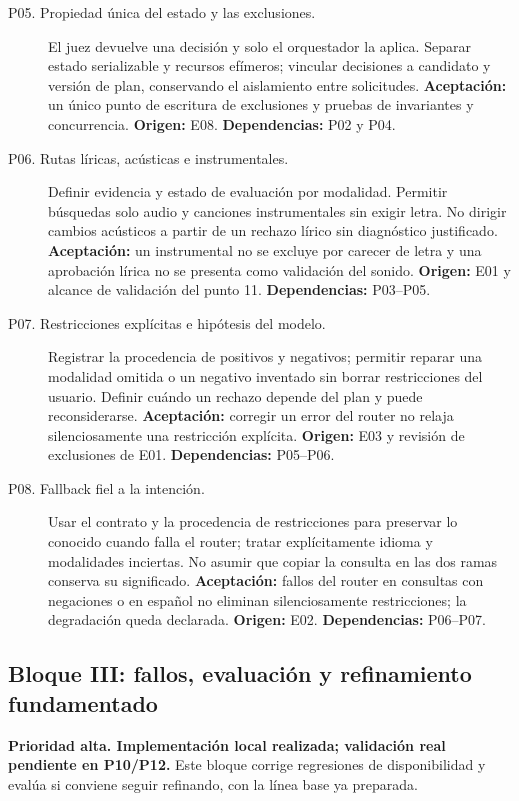 \begin{description}
\item[P05. Propiedad única del estado y las exclusiones.]
El juez devuelve una decisión y solo el orquestador la aplica. Separar estado
serializable y recursos efímeros; vincular decisiones a candidato y versión
de plan, conservando el aislamiento entre solicitudes.
\textbf{Aceptación:} un único punto de escritura de exclusiones y pruebas de
invariantes y concurrencia. \textbf{Origen:} E08.
\textbf{Dependencias:} P02 y P04.

\item[P06. Rutas líricas, acústicas e instrumentales.]
Definir evidencia y estado de evaluación por modalidad. Permitir búsquedas
solo audio y canciones instrumentales sin exigir letra. No dirigir cambios
acústicos a partir de un rechazo lírico sin diagnóstico justificado.
\textbf{Aceptación:} un instrumental no se excluye por carecer de letra y una
aprobación lírica no se presenta como validación del sonido.
\textbf{Origen:} E01 y alcance de validación del punto 11.
\textbf{Dependencias:} P03--P05.

\item[P07. Restricciones explícitas e hipótesis del modelo.]
Registrar la procedencia de positivos y negativos; permitir reparar una
modalidad omitida o un negativo inventado sin borrar restricciones del usuario.
Definir cuándo un rechazo depende del plan y puede reconsiderarse.
\textbf{Aceptación:} corregir un error del router no relaja silenciosamente
una restricción explícita. \textbf{Origen:} E03 y revisión de exclusiones de E01.
\textbf{Dependencias:} P05--P06.

\item[P08. Fallback fiel a la intención.]
Usar el contrato y la procedencia de restricciones para preservar lo conocido
cuando falla el router; tratar explícitamente idioma y modalidades inciertas.
No asumir que copiar la consulta en las dos ramas conserva su significado.
\textbf{Aceptación:} fallos del router en consultas con negaciones o en español
no eliminan silenciosamente restricciones; la degradación queda declarada.
\textbf{Origen:} E02. \textbf{Dependencias:} P06--P07.
\end{description}

\subsection{Bloque III: fallos, evaluación y refinamiento fundamentado}
\textbf{Prioridad alta. Implementación local realizada; validación real pendiente en P10/P12.} Este bloque corrige regresiones de disponibilidad y
evalúa si conviene seguir refinando, con la línea base ya preparada.

